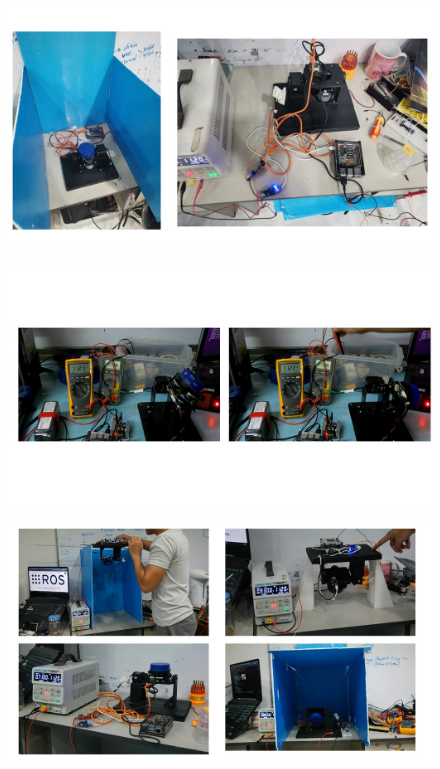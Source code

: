 \begin{figure}[H]
	\centering
	\includegraphics[width=1\textwidth]{Figures/Appendecis/testing/Slide2}
\end{figure}
\begin{figure}[H]
	\centering
	\includegraphics[width=1\textwidth]{Figures/Appendecis/testing/Slide3}
\end{figure}
\begin{figure}[H]
	\centering
	\includegraphics[width=1\textwidth]{Figures/Appendecis/testing/Slide4}
\end{figure}

